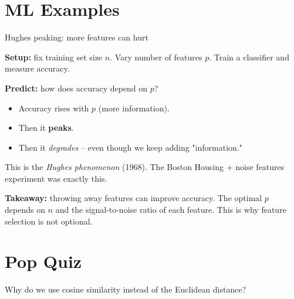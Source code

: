 \documentclass{beamer}
\begin{document}
\section{ML Examples}


\begin{frame}{Hughes peaking: more features can hurt}

\textbf{Setup:} fix training set size $n$. Vary number of features $p$. Train a classifier and measure accuracy.

\vspace{0.5em}
\textbf{Predict:} how does accuracy depend on $p$?

\pause

\begin{itemize}
    \item Accuracy rises with $p$ (more information).
    \item Then it \textbf{peaks}.
    \item Then it \emph{degrades} -- even though we keep adding "information."
\end{itemize}

\vspace{0.5em}
This is the \emph{Hughes phenomenon} (1968). The Boston Housing + noise features experiment was exactly this.

\vspace{0.5em}
\textbf{Takeaway:} throwing away features can improve accuracy. The optimal $p$ depends on $n$ and the signal-to-noise ratio of each feature. This is why feature selection is not optional.

\end{frame}

\section{Pop Quiz}
\begin{frame}
    Why do we use cosine similarity instead of the Euclidean distance?
\end{frame}
\end{document}
